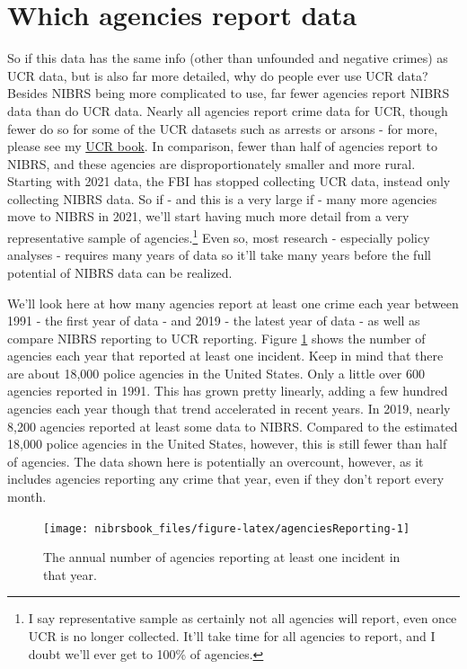 \documentclass[
  12pt,
  openany]{book}
\begin{document}
\hypertarget{which-agencies-report-data}{%
\section{Which agencies report data}\label{which-agencies-report-data}}

So if this data has the same info (other than unfounded and negative crimes) as UCR data, but is also far more detailed, why do people ever use UCR data? Besides NIBRS being more complicated to use, far fewer agencies report NIBRS data than do UCR data. Nearly all agencies report crime data for UCR, though fewer do so for some of the UCR datasets such as arrests or arsons - for more, please see my \href{https://ucrbook.com/}{UCR book}. In comparison, fewer than half of agencies report to NIBRS, and these agencies are disproportionately smaller and more rural. Starting with 2021 data, the FBI has stopped collecting UCR data, instead only collecting NIBRS data. So if - and this is a very large if - many more agencies move to NIBRS in 2021, we'll start having much more detail from a very representative sample of agencies.\footnote{I say representative sample as certainly not all agencies will report, even once UCR is no longer collected. It'll take time for all agencies to report, and I doubt we'll ever get to 100\% of agencies.} Even so, most research - especially policy analyses - requires many years of data so it'll take many years before the full potential of NIBRS data can be realized.

We'll look here at how many agencies report at least one crime each year between 1991 - the first year of data - and 2019 - the latest year of data - as well as compare NIBRS reporting to UCR reporting. Figure \ref{fig:agenciesReporting} shows the number of agencies each year that reported at least one incident. Keep in mind that there are about 18,000 police agencies in the United States. Only a little over 600 agencies reported in 1991. This has grown pretty linearly, adding a few hundred agencies each year though that trend accelerated in recent years. In 2019, nearly 8,200 agencies reported at least some data to NIBRS. Compared to the estimated 18,000 police agencies in the United States, however, this is still fewer than half of agencies. The data shown here is potentially an overcount, however, as it includes agencies reporting any crime that year, even if they don't report every month.

\begin{figure}

{\centering \texttt{[image: nibrsbook\_files/figure-latex/agenciesReporting-1]} 

}

\caption{The annual number of agencies reporting at least one incident in that year.}\label{fig:agenciesReporting}
\end{figure}
\end{document}
